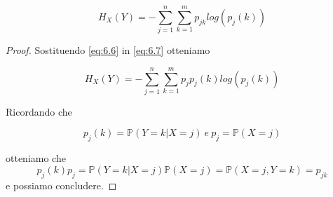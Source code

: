 \begin{lem}
\begin{equation} \label{eq:6.8}
H_X(Y)=-\sum_{j=1}^n\sum_{k=1}^m p_{jk}log(p_j(k))
\end{equation}
\end{lem}
\begin{proof}
Sostituendo \ref{eq:6.6} in \ref{eq:6.7} otteniamo

\begin{equation} \label{eq:6.8.1}
H_X(Y)=-\sum_{j=1}^n\sum_{k=1}^m p_{j}p_j(k)log(p_j(k))
\end{equation}

Ricordando che 

$$p_j(k)=\mathbb{P}(Y=k|X=j)\ e \ p_j=\mathbb{P}(X=j)$$

otteniamo che 
$$p_j(k)p_j=\mathbb{P}(Y=k|X=j)\mathbb{P}(X=j)=\mathbb{P}(X=j,Y=k)=p_{jk}$$
e possiamo concludere.
\end{proof}



